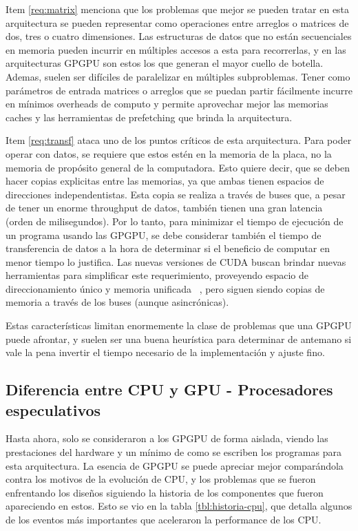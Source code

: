 Item \ref{req:matrix} menciona que los problemas que mejor se pueden tratar en esta
arquitectura se pueden representar como operaciones entre arreglos o matrices de
dos, tres o cuatro dimensiones. Las estructuras de datos que no est\'an secuenciales
en memoria pueden incurrir en m\'ultiples accesos a esta para recorrerlas, y en las
arquitecturas GPGPU son estos los que generan el mayor cuello de botella. Ademas,
suelen ser dif\'iciles de paralelizar en m\'ultiples subproblemas. Tener como par\'ametros de
entrada matrices o arreglos que se puedan partir f\'acilmente incurre en m\'inimos
overheads de computo y permite aprovechar mejor las memorias caches y las herramientas de
prefetching que brinda la arquitectura.

Item \ref{req:transf} ataca uno de los puntos cr\'iticos de esta arquitectura. Para poder
operar con datos, se requiere que estos est\'en en la memoria de la placa, no la memoria
de prop\'osito general de la computadora. Esto quiere decir, que se deben hacer copias
explicitas entre las memorias, ya que ambas tienen espacios de direcciones independentistas.
Esta copia se realiza a trav\'es de buses que, a pesar de tener un enorme throughput de
datos, tambi\'en tienen una gran latencia (orden de milisegundos). Por lo tanto, para minimizar
el tiempo de ejecuci\'on de un programa usando las GPGPU, se debe considerar tambi\'en el
tiempo de transferencia de datos a la hora de determinar si el beneficio de computar en
menor tiempo lo justifica. Las nuevas versiones de CUDA buscan brindar nuevas herramientas
para simplificar este requerimiento, proveyendo espacio de direccionamiento \'unico y
memoria unificada ~\cite{farberCuda}, pero siguen siendo copias de memoria a trav\'es de los
buses (aunque asincr\'onicas).

Estas caracter\'isticas limitan enormemente la clase de problemas que una GPGPU puede
afrontar, y suelen ser una buena heur\'istica para determinar de antemano si vale la pena
invertir el tiempo necesario de la implementaci\'on y ajuste fino.


\subsection{Diferencia entre CPU y GPU - Procesadores especulativos}
Hasta ahora, solo se consideraron a los GPGPU de forma aislada, viendo las prestaciones del hardware y un m\'inimo
de como se escriben los programas para esta arquitectura. La esencia de GPGPU se puede apreciar mejor
compar\'andola contra los motivos de la evoluci\'on de CPU, y los problemas que se fueron enfrentando
los dise\~nos siguiendo la historia de los componentes que fueron apareciendo en estos. Esto se vio
en la tabla \ref{tbl:historia-cpu}, que detalla algunos de los eventos m\'as importantes que aceleraron
la performance de los CPU.

